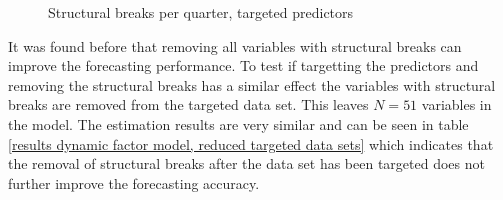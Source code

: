 \documentclass[12pt]{article}
\begin{document}
\begin{figure}[htp]
\centering
{}
\caption{Structural breaks per quarter, targeted predictors}
\label{structural breaks per period, targeted predictors}
\end{figure}

\clearpage

It was found before that removing all variables with structural breaks can improve the forecasting performance. To test if targetting the predictors and removing the structural breaks has a similar effect the variables with structural breaks are removed from the targeted data set.
This leaves $N = 51$ variables in the model. The estimation results are very similar and can be seen in table \ref{results dynamic factor model, reduced targeted data sets} which indicates that the removal of structural breaks after the data set has been targeted does not further improve the forecasting accuracy.
\end{document}

